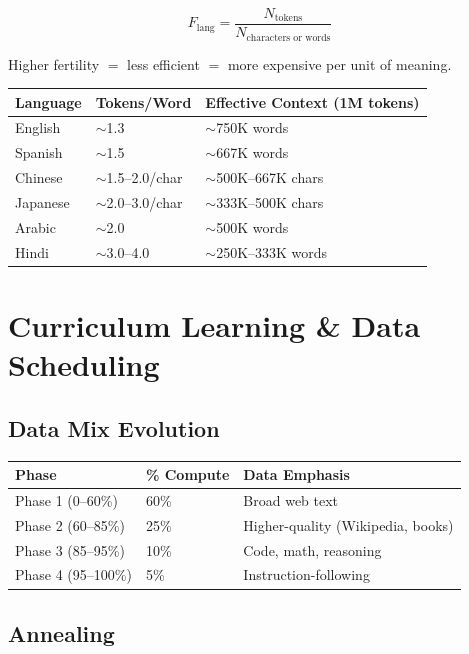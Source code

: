 \documentclass[11pt,a4paper]{article}
\begin{document}
$$F_{\text{lang}} = \frac{N_{\text{tokens}}}{N_{\text{characters or words}}}$$

Higher fertility $=$ less efficient $=$ more expensive per unit of meaning.

\begin{center}
\begin{tabular}{lll}
\toprule
\textbf{Language} & \textbf{Tokens/Word} & \textbf{Effective Context (1M tokens)} \\
\midrule
English & $\sim$1.3 & $\sim$750K words \\
Spanish & $\sim$1.5 & $\sim$667K words \\
Chinese & $\sim$1.5--2.0/char & $\sim$500K--667K chars \\
Japanese & $\sim$2.0--3.0/char & $\sim$333K--500K chars \\
Arabic & $\sim$2.0 & $\sim$500K words \\
Hindi & $\sim$3.0--4.0 & $\sim$250K--333K words \\
\bottomrule
\end{tabular}
\end{center}

\section{Curriculum Learning \& Data Scheduling}

\subsection{Data Mix Evolution}

\begin{center}
\begin{tabular}{lll}
\toprule
\textbf{Phase} & \textbf{\% Compute} & \textbf{Data Emphasis} \\
\midrule
Phase 1 (0--60\%) & 60\% & Broad web text \\
Phase 2 (60--85\%) & 25\% & Higher-quality (Wikipedia, books) \\
Phase 3 (85--95\%) & 10\% & Code, math, reasoning \\
Phase 4 (95--100\%) & 5\% & Instruction-following \\
\bottomrule
\end{tabular}
\end{center}

\subsection{Annealing}
\end{document}

